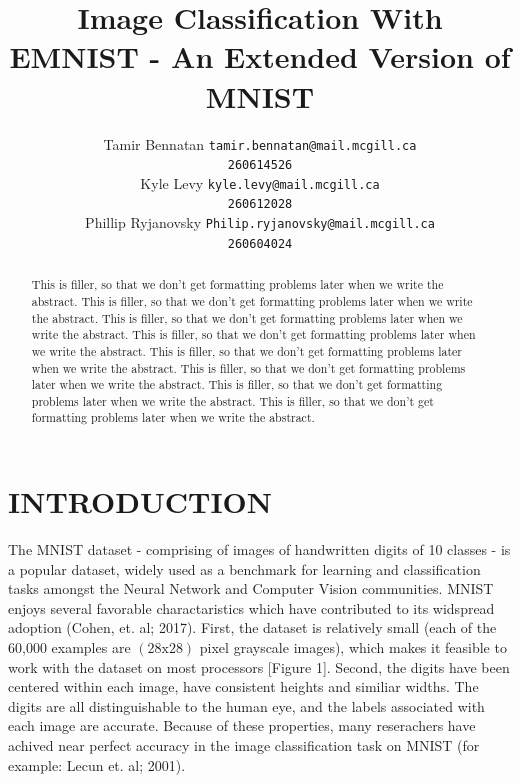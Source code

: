 \documentclass[letterpaper, 10 pt, conference]{ieeeconf}  %
\title{\LARGE \bf
Image Classification With EMNIST - An Extended Version of MNIST
}
\author{ \parbox{2 in}{\centering Tamir Bennatan
         {\tt\small tamir.bennatan@mail.mcgill.ca\\}
         {\tt\small 260614526}}
         \hspace*{ 0.3 in}
         \parbox{2 in}{\centering Kyle Levy
         {\tt\small kyle.levy@mail.mcgill.ca\\}
         {\tt\small 260612028}}
         \hspace*{0.3 in}
         \parbox{2 in}{\centering Phillip Ryjanovsky
         {\tt\small Philip.ryjanovsky@mail.mcgill.ca\\}
         {\tt\small 260604024}}
}
\begin{document}
\maketitle
\thispagestyle{empty}
\pagestyle{empty}


\begin{abstract}

This is filler, so that we don't get formatting problems later when we write the abstract. This is filler, so that we don't get formatting problems later when we write the abstract. This is filler, so that we don't get formatting problems later when we write the abstract. This is filler, so that we don't get formatting problems later when we write the abstract. This is filler, so that we don't get formatting problems later when we write the abstract. This is filler, so that we don't get formatting problems later when we write the abstract. This is filler, so that we don't get formatting problems later when we write the abstract. This is filler, so that we don't get formatting problems later when we write the abstract. 

\end{abstract}


\section{INTRODUCTION}

The MNIST dataset - comprising of images of handwritten digits of 10 classes - is a popular dataset, widely used as a  benchmark for learning and classification tasks amongst the Neural Network and Computer Vision communities. MNIST enjoys several favorable charactaristics which have contributed to its widspread adoption (Cohen, et. al; 2017). First, the dataset is relatively small (each of the 60,000 examples are $(28\text{x}28)$ pixel grayscale images), which makes it feasible to work with the dataset on most processors [Figure 1]. Second, the digits have been centered within each image, have consistent heights and similiar widths. The digits are all distinguishable to the human eye, and the labels associated with each image are accurate. Because of these properties, many reserachers have achived near perfect accuracy in the image classification task on MNIST (for example: Lecun et. al; 2001).
\end{document}

